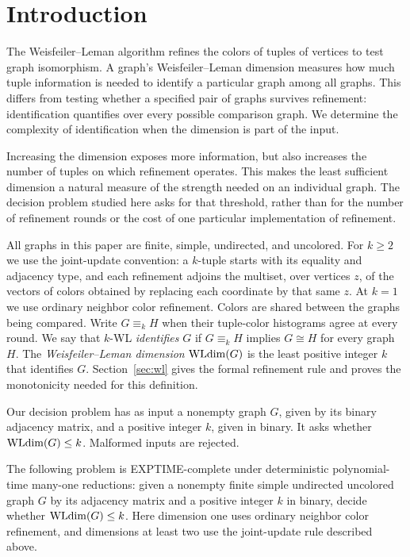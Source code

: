 \section{Introduction}
\label{sec:introduction}

The Weisfeiler--Leman algorithm refines the colors of tuples of vertices
to test graph isomorphism. A graph's Weisfeiler--Leman dimension measures how much tuple
information is needed to identify a particular graph among all graphs.
This differs from testing whether a specified pair of graphs survives
refinement: identification quantifies over every possible comparison
graph. We determine the complexity of identification when the dimension
is part of the input.

Increasing the dimension exposes more information, but also increases
the number of tuples on which refinement operates. This makes the least
sufficient dimension a natural measure of the strength needed on an
individual graph. The decision problem studied here asks for that
threshold, rather than for the number of refinement rounds or the cost
of one particular implementation of refinement.

All graphs in this paper are finite, simple, undirected, and uncolored.
For $k\ge2$ we use the joint-update convention: a $k$-tuple starts with
its equality and adjacency type, and each refinement adjoins the
multiset, over vertices $z$, of the vectors of colors obtained by
replacing each coordinate by that same $z$. At $k=1$ we use ordinary
neighbor color refinement. Colors are shared between the graphs being
compared. Write $G\equiv_k H$ when their tuple-color histograms agree
at every round. We say that $k$-WL \emph{identifies} $G$ if
$G\equiv_k H$ implies $G\cong H$ for every graph $H$.
The \emph{Weisfeiler--Leman dimension} $\operatorname{WLdim}(G)$ is the least positive
integer $k$ that identifies $G$. Section~\ref{sec:wl} gives the formal
refinement rule and proves the monotonicity needed for this definition.

Our decision problem has as input a nonempty graph $G$, given by its
binary adjacency matrix, and a positive integer $k$, given in binary.
It asks whether $\operatorname{WLdim}(G)\le k$. Malformed inputs are rejected.

\begin{theorem}
\label{thm:main}
The following problem is EXPTIME-complete under deterministic
polynomial-time many-one reductions: given a nonempty finite simple
undirected uncolored graph $G$ by its adjacency matrix and a positive
integer $k$ in binary, decide whether $\operatorname{WLdim}(G)\le k$.
Here dimension one uses ordinary neighbor color refinement, and
dimensions at least two use the joint-update rule described above.
\end{theorem}

